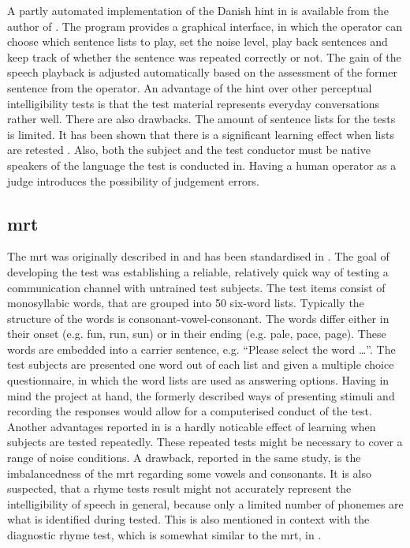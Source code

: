 A partly automated implementation of the Danish \gls{hint} in \matlab is available from the author of \citep{hint_2011}. The program provides a graphical interface, in which the operator can choose which sentence lists to play, set the noise level, play back sentences and keep track of whether the sentence was repeated correctly or not. The gain of the speech playback is adjusted automatically based on the assessment of the former sentence from the operator.
An advantage of the \gls{hint} over other perceptual intelligibility tests is that the test material represents everyday conversations rather well.
There are also drawbacks. The amount of sentence lists for the tests is limited. It has been shown that there is a significant learning effect when lists are retested \citep[p. 205 f.]{hint_2011}.
Also, both the subject and the test conductor must be native speakers of the language the test is conducted in. Having a human operator as a judge introduces the possibility of judgement errors.

\subsection{\gls{mrt}}\label{ssec:mrt}
The \gls{mrt} was originally described in \citep{mrt_63} and has been standardised in \citep{ansi_s3.2}. The goal of developing the test was establishing a reliable, relatively quick way of testing a communication channel with untrained test subjects.
The test items consist of monosyllabic words, that are grouped into 50 six-word lists. Typically the structure of the words is consonant-vowel-consonant. The words differ either in their onset (e.g. fun, run, sun) or in their ending (e.g. pale, pace, page). 
These words are embedded into a carrier sentence, e.g. \enquote{Please select the word \dots}. 
The test subjects are presented one word out of each list and given a multiple choice questionnaire, in which the word lists are used as answering options. 
Having in mind the project at hand, the formerly described ways of presenting stimuli and recording the responses would allow for a computerised conduct of the test.
Another advantages reported in \citep[p. 17]{arl_us_army} is a hardly noticable effect of learning when subjects are tested repeatedly. These repeated tests might be necessary to cover a range of noise conditions.
A drawback, reported in the same study, is the imbalancedness of the \gls{mrt} regarding some vowels and consonants. 
It is also suspected, that a rhyme tests result might not accurately represent the intelligibility of speech in general, because only a limited number of phonemes are what is identified during tested. This is also mentioned in context with the diagnostic rhyme test, which is somewhat similar to the \gls{mrt}, in \citep{greenspan_98}. 

